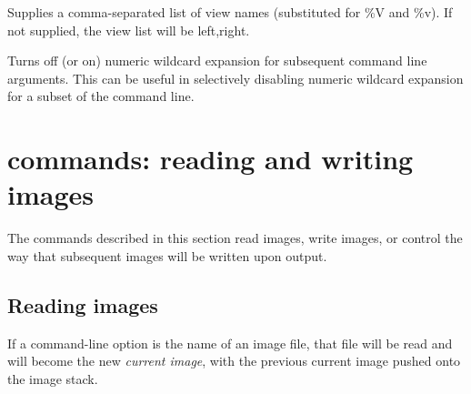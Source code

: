 Supplies a comma-separated list of view names (substituted for {\cf \%V}
and {\cf \%v}). If not supplied, the view list will be {\cf left,right}.
\apiend

Turns off (or on) numeric wildcard expansion for subsequent command
line arguments. This can be useful in selectively disabling numeric wildcard
expansion for a subset of the command line.
\apiend

\section{\oiiotool commands: reading and writing images}

The commands described in this section read images, write images,
or control the way that subsequent images will be written upon output.

\subsection*{Reading images}

If a command-line option is the name of an image file, that file will
be read and will become the new \emph{current image}, with the previous
current image pushed onto the image stack.
\apiend

